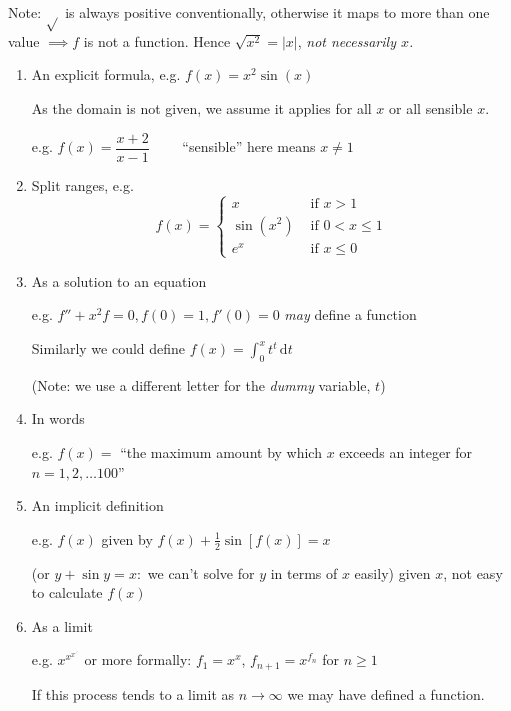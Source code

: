 \documentclass[twoside]{scrartcl}
\begin{document}
Note: $\sqrt{}$ is always positive conventionally, otherwise it maps to more than one value $\implies f$ is not a function. Hence $\sqrt{x^2} = |x|$, \textit{not necessarily $x$.}\\



\begin{enumerate}
\item An explicit formula, e.g. $f(x) = x^2\sin(x)$
 
As the domain is not given, we assume it applies for all $x$ or all sensible $x$. 

e.g. $f(x) = \dfrac{x+2}{x-1} \qquad$ ``sensible'' here means $x \neq 1$\\

\item Split ranges, e.g.
\[f(x) = \begin{cases}
 x & \text{ if }  x > 1\\
 \sin(x^2) & \text{ if } 0 < x \leq 1\\
 e^x & \text{ if } x \leq 0
 \end{cases}\]
 
 
\item As a solution to an equation

e.g. $f'' + x^2f = 0, f(0) = 1, f'(0) = 0$ \textit{may} define a function
 
Similarly we could define $f(x) = \displaystyle{\int_0^x t^t \, \mathrm{d}t}$

(Note: we use a different letter for the \textit{dummy} variable, $t$)\\

\item In words

 e.g. $f(x) =$ ``the maximum amount by which $x$ exceeds an integer for $ n = 1,2,\dots 100$''

\item An implicit definition

 e.g. $f(x)$ given by $f(x) + \frac{1}{2}\sin[f(x)] = x$

(or $y + \sin y = x :$ we can't solve for $y$ in terms of $x$ easily) given $x$, not easy to calculate $f(x)$\\

\item As a limit

 e.g. $x^{x^{x^{\iddots}}}$ or more formally: $f_1 = x^x$, $f_{n+1} = x^{f_n}$ for $n \geq 1$

If this process tends to a limit as $n \to \infty$ we may have defined a function.
\end{enumerate}\vspace*{5pt}
\end{document}
